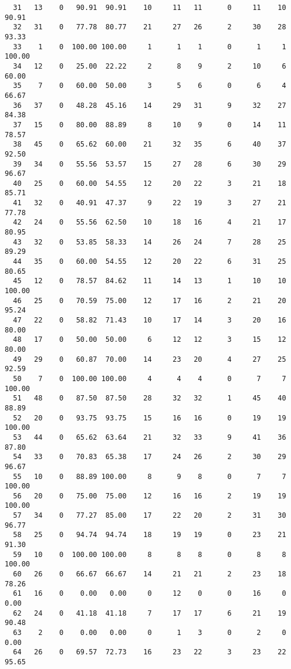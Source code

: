 \begin{verbatim}
  31   13    0   90.91  90.91    10     11   11      0     11    10    90.91
  32   31    0   77.78  80.77    21     27   26      2     30    28    93.33
  33    1    0  100.00 100.00     1      1    1      0      1     1   100.00
  34   12    0   25.00  22.22     2      8    9      2     10     6    60.00
  35    7    0   60.00  50.00     3      5    6      0      6     4    66.67
  36   37    0   48.28  45.16    14     29   31      9     32    27    84.38
  37   15    0   80.00  88.89     8     10    9      0     14    11    78.57
  38   45    0   65.62  60.00    21     32   35      6     40    37    92.50
  39   34    0   55.56  53.57    15     27   28      6     30    29    96.67
  40   25    0   60.00  54.55    12     20   22      3     21    18    85.71
  41   32    0   40.91  47.37     9     22   19      3     27    21    77.78
  42   24    0   55.56  62.50    10     18   16      4     21    17    80.95
  43   32    0   53.85  58.33    14     26   24      7     28    25    89.29
  44   35    0   60.00  54.55    12     20   22      6     31    25    80.65
  45   12    0   78.57  84.62    11     14   13      1     10    10   100.00
  46   25    0   70.59  75.00    12     17   16      2     21    20    95.24
  47   22    0   58.82  71.43    10     17   14      3     20    16    80.00
  48   17    0   50.00  50.00     6     12   12      3     15    12    80.00
  49   29    0   60.87  70.00    14     23   20      4     27    25    92.59
  50    7    0  100.00 100.00     4      4    4      0      7     7   100.00
  51   48    0   87.50  87.50    28     32   32      1     45    40    88.89
  52   20    0   93.75  93.75    15     16   16      0     19    19   100.00
  53   44    0   65.62  63.64    21     32   33      9     41    36    87.80
  54   33    0   70.83  65.38    17     24   26      2     30    29    96.67
  55   10    0   88.89 100.00     8      9    8      0      7     7   100.00
  56   20    0   75.00  75.00    12     16   16      2     19    19   100.00
  57   34    0   77.27  85.00    17     22   20      2     31    30    96.77
  58   25    0   94.74  94.74    18     19   19      0     23    21    91.30
  59   10    0  100.00 100.00     8      8    8      0      8     8   100.00
  60   26    0   66.67  66.67    14     21   21      2     23    18    78.26
  61   16    0    0.00   0.00     0     12    0      0     16     0     0.00
  62   24    0   41.18  41.18     7     17   17      6     21    19    90.48
  63    2    0    0.00   0.00     0      1    3      0      2     0     0.00
  64   26    0   69.57  72.73    16     23   22      3     23    22    95.65

\end{verbatim}
